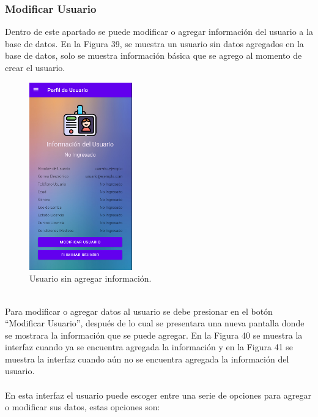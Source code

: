\documentclass[a4paper,10pt, oneside, titlepage]{article}
\begin{document}
	\subsubsection{Modificar Usuario}
	Dentro de este apartado se puede modificar o agregar información del usuario a la base de datos. En la Figura 39, se muestra un usuario sin datos agregados en la base de datos, solo se muestra información básica que se agrego al momento de crear el usuario.
	\begin{figure}[!ht]
		\centering
		\includegraphics[width = 0.4\linewidth, height = 8.1cm]{39.png}
		\caption{Usuario sin agregar información.}
	\end{figure}\\
	Para modificar o agregar datos al usuario se debe presionar en el botón ``Modificar Usuario'', después de lo cual se presentara una nueva pantalla donde se mostrara la información que se puede agregar. En la Figura 40 se muestra la interfaz cuando ya se encuentra agregada la información y en la Figura 41 se muestra la interfaz cuando aún no se encuentra agregada la información del usuario.\\\\
	En esta interfaz el usuario puede escoger entre una serie de opciones para agregar o modificar sus datos, estas opciones son:
\end{document}
